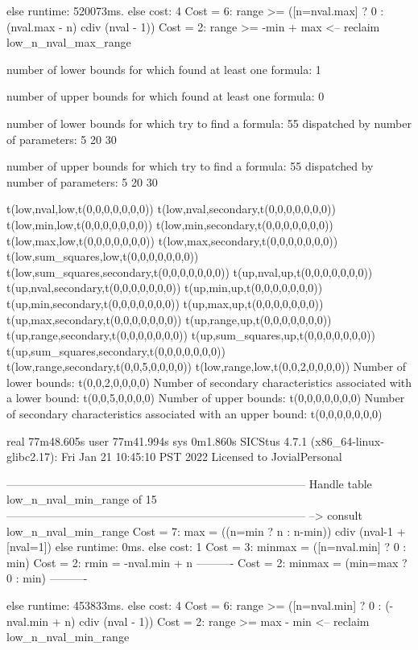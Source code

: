 else runtime: 520073ms. else cost: 4
Cost =  6:  range >= ([n=nval.max] ? 0 : (nval.max - n) cdiv (nval - 1)) %
Cost =  2:  range >= -min + max
<-- reclaim low_n_nval_max_range

number of lower bounds for which found at least one formula: 1

number of upper bounds for which found at least one formula: 0

number of lower bounds for which try to find a formula: 55
dispatched by number of parameters: 5  20  30

number of upper bounds for which try to find a formula: 55
dispatched by number of parameters: 5  20  30

t(low,nval,low,t(0,0,0,0,0,0,0))
t(low,nval,secondary,t(0,0,0,0,0,0,0))
t(low,min,low,t(0,0,0,0,0,0,0))
t(low,min,secondary,t(0,0,0,0,0,0,0))
t(low,max,low,t(0,0,0,0,0,0,0))
t(low,max,secondary,t(0,0,0,0,0,0,0))
t(low,sum_squares,low,t(0,0,0,0,0,0,0))
t(low,sum_squares,secondary,t(0,0,0,0,0,0,0))
t(up,nval,up,t(0,0,0,0,0,0,0))
t(up,nval,secondary,t(0,0,0,0,0,0,0))
t(up,min,up,t(0,0,0,0,0,0,0))
t(up,min,secondary,t(0,0,0,0,0,0,0))
t(up,max,up,t(0,0,0,0,0,0,0))
t(up,max,secondary,t(0,0,0,0,0,0,0))
t(up,range,up,t(0,0,0,0,0,0,0))
t(up,range,secondary,t(0,0,0,0,0,0,0))
t(up,sum_squares,up,t(0,0,0,0,0,0,0))
t(up,sum_squares,secondary,t(0,0,0,0,0,0,0))
t(low,range,secondary,t(0,0,5,0,0,0,0))
t(low,range,low,t(0,0,2,0,0,0,0))
Number of lower bounds:                                             t(0,0,2,0,0,0,0)
Number of secondary characteristics associated with a lower bound:  t(0,0,5,0,0,0,0)
Number of upper bounds:                                             t(0,0,0,0,0,0,0)
Number of secondary characteristics associated with an upper bound: t(0,0,0,0,0,0,0)

real	77m48.605s
user	77m41.994s
sys	0m1.860s
SICStus 4.7.1 (x86_64-linux-glibc2.17): Fri Jan 21 10:45:10 PST 2022
Licensed to JovialPersonal


--------------------------------------------------------------------------------
Handle table low_n_nval_min_range of 15
--------------------------------------------------------------------------------
--> consult low_n_nval_min_range
Cost =  7:  max    = ((n=min ? n : n-min)) cdiv (nval-1 + [nval=1]) %
else runtime: 0ms. else cost: 1
Cost =  3:  minmax = ([n=nval.min] ? 0 : min) %
Cost =  2:  rmin   = -nval.min + n
----------
Cost =  2:  minmax = (min=max ? 0 : min)
----------

else runtime: 453833ms. else cost: 4
Cost =  6:  range >= ([n=nval.min] ? 0 : (-nval.min + n) cdiv (nval - 1)) %
Cost =  2:  range >= max - min
<-- reclaim low_n_nval_min_range

